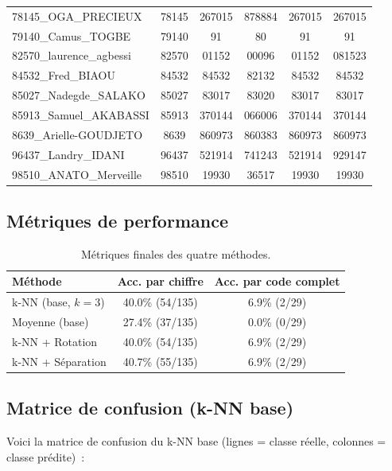 \documentclass[a4paper,11pt]{article}
\begin{document}
\begin{longtable}{l|c|c|c|c|c}
78145\_OGA\_PRECIEUX & 78145 & 267015 & 878884 & 267015 & 267015 \\
79140\_Camus\_TOGBE & 79140 & 91 & 80 & 91 & 91 \\
82570\_laurence\_agbessi & 82570 & 01152 & 00096 & 01152 & 081523 \\
84532\_Fred\_BIAOU & 84532 & 84532 & 82132 & 84532 & 84532 \\
85027\_Nadegde\_SALAKO & 85027 & 83017 & 83020 & 83017 & 83017 \\
85913\_Samuel\_AKABASSI & 85913 & 370144 & 066006 & 370144 & 370144 \\
8639\_Arielle-GOUDJETO & 8639 & 860973 & 860383 & 860973 & 860973 \\
96437\_Landry\_IDANI & 96437 & 521914 & 741243 & 521914 & 929147 \\
98510\_ANATO\_Merveille & 98510 & 19930 & 36517 & 19930 & 19930 \\
\end{longtable}

\subsection{Métriques de performance}

\begin{table}[H]
\centering
\caption{Métriques finales des quatre méthodes.}
\label{tab:metriques}
\begin{tabular}{l|c|c}
\toprule
\textbf{Méthode} & \textbf{Acc. par chiffre} & \textbf{Acc. par code complet} \\
\midrule
k-NN (base, $k=3$) & 40.0\% (54/135) & 6.9\% (2/29) \\
Moyenne (base) & 27.4\% (37/135) & 0.0\% (0/29) \\
k-NN + Rotation & 40.0\% (54/135) & 6.9\% (2/29) \\
k-NN + Séparation & 40.7\% (55/135) & 6.9\% (2/29) \\
\bottomrule
\end{tabular}
\end{table}

\subsection{Matrice de confusion (k-NN base)}

Voici la matrice de confusion du k-NN base (lignes = classe réelle, colonnes = classe prédite)~:
\end{document}
